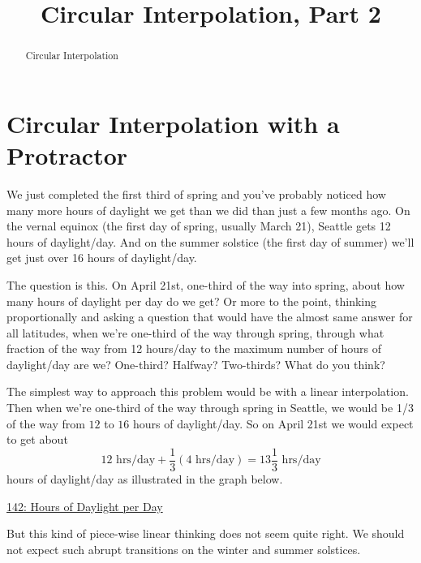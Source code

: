 \documentclass{ximera}
\title{Circular Interpolation, Part 2}
\begin{document}
\begin{abstract}
Circular Interpolation
\end{abstract}
\maketitle


\section{Circular Interpolation with a Protractor}

\begin{example}  \label{Ex:Lsdf4LL}
We just completed the first third of spring and you've probably noticed how many more hours of daylight we get than we did than just a few months ago. On the vernal equinox (the first day of spring, usually March 21), Seattle gets 12 hours of daylight/day. And on the summer solstice (the first day of summer) we'll get just over 16 hours of daylight/day. 

The question is this. On April 21st, one-third of the way into spring, about how many hours of daylight per day do we get? Or more to the point, thinking proportionally and asking a question that would have the almost same answer for all latitudes, when we're one-third of the way through spring, through what fraction of the way from 12 hours/day to the maximum number of hours of daylight/day are we? One-third? Halfway? Two-thirds? What do you think?

The simplest way to approach this problem would be with a linear interpolation. Then when we're one-third of the way through spring in Seattle, we would be 1/3 of the way from $12$ to $16$ hours of daylight/day. So on April 21st we would expect to get about
\[
    12 \text{ hrs/day} + \frac{1}{3}(4 \text{ hrs/day}) = 13 \frac{1}{3}\text{ hrs/day}
\]
hours of daylight/day as illustrated in the graph below.


\begin{onlineOnly}
    \begin{center}
\end{center}
\end{onlineOnly}

\href{https://www.desmos.com/calculator/esj3yytaug}{142: Hours of Daylight per Day}

But this kind of piece-wise linear thinking does not seem quite right. We should not expect such abrupt transitions on the winter and summer solstices.


\end{example}
\end{document}
